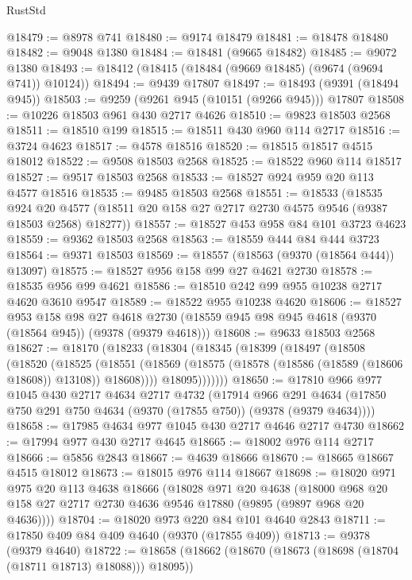 \begin{lexlean}{RustStd}
\begin{coremodule}
@18479 := @8978 @741
@18480 := @9174 @18479
@18481 := @18478 @18480
@18482 := @9048 @1380
@18484 := @18481 (@9665 @18482)
@18485 := @9072 @1380
@18493 := @18412 (@18415 (@18484 (@9669 @18485) (@9674 (@9694 @741)) @10124))
@18494 := @9439 @17807
@18497 := @18493 (@9391 (@18494 @945))
@18503 := @9259 (@9261 @945 (@10151 (@9266 @945))) @17807
@18508 := @10226 @18503 @961 @430 @2717 @4626
@18510 := @9823 @18503 @2568
@18511 := @18510 @199
@18515 := @18511 @430 @960 @114 @2717
@18516 := @3724 @4623
@18517 := @4578 @18516
@18520 := @18515 @18517 @4515 @18012
@18522 := @9508 @18503 @2568
@18525 := @18522 @960 @114 @18517
@18527 := @9517 @18503 @2568
@18533 := @18527 @924 @959 @20 @113 @4577 @18516
@18535 := @9485 @18503 @2568
@18551 := @18533
    (@18535
      @924
      @20
      @4577
      (@18511 @20 @158 @27 @2717 @2730 @4575 @9546 (@9387 @18503 @2568) @18277))
@18557 := @18527 @453 @958 @84 @101 @3723 @4623
@18559 := @9362 @18503 @2568
@18563 := @18559 @444 @84 @444 @3723
@18564 := @9371 @18503
@18569 := @18557 (@18563 (@9370 (@18564 @444)) @13097)
@18575 := @18527 @956 @158 @99 @27 @4621 @2730
@18578 := @18535 @956 @99 @4621
@18586 := @18510 @242 @99 @955 @10238 @2717 @4620 @3610 @9547
@18589 := @18522 @955 @10238 @4620
@18606 := @18527
    @953
    @158
    @98
    @27
    @4618
    @2730
    (@18559 @945 @98 @945 @4618 (@9370 (@18564 @945)) (@9378 (@9379 @4618)))
@18608 := @9633 @18503 @2568
@18627 := @18170
    (@18233
      (@18304
        (@18345
          (@18399
            (@18497
              (@18508
                (@18520
                  (@18525
                    (@18551
                      (@18569 (@18575 (@18578 (@18586 (@18589 (@18606 @18608)) @13108)) @18608))))
                  @18095)))))))
@18650 := @17810
    @966
    @977
    @1045
    @430
    @2717
    @4634
    @2717
    @4732
    (@17914
      @966
      @291
      @4634
      (@17850 @750 @291 @750 @4634 (@9370 (@17855 @750)) (@9378 (@9379 @4634))))
@18658 := @17985 @4634 @977 @1045 @430 @2717 @4646 @2717 @4730
@18662 := @17994 @977 @430 @2717 @4645
@18665 := @18002 @976 @114 @2717
@18666 := @5856 @2843
@18667 := @4639 @18666
@18670 := @18665 @18667 @4515 @18012
@18673 := @18015 @976 @114 @18667
@18698 := @18020
    @971
    @975
    @20
    @113
    @4638
    @18666
    (@18028
      @971
      @20
      @4638
      (@18000 @968 @20 @158 @27 @2717 @2730 @4636 @9546 @17880 (@9895 (@9897 @968 @20 @4636))))
@18704 := @18020 @973 @220 @84 @101 @4640 @2843
@18711 := @17850 @409 @84 @409 @4640 (@9370 (@17855 @409))
@18713 := @9378 (@9379 @4640)
@18722 := @18658 (@18662 (@18670 (@18673 (@18698 (@18704 (@18711 @18713) @18088))) @18095))

\end{coremodule}
\end{lexlean}
